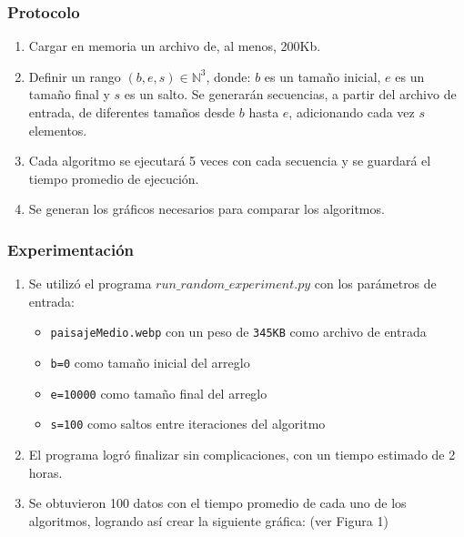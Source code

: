 \documentclass[letter]{article}
\begin{document}
\subsubsection{Protocolo}
\begin{enumerate}
    \item Cargar en memoria un archivo de, al menos, 200Kb.
    \item Definir un rango $(b,e,s)\in\mathbb{N}^3$, donde: $b$ es un tamaño inicial, $e$ es un tamaño final y $s$ es un salto. Se generarán secuencias, a partir del archivo de entrada, de diferentes tamaños desde $b$ hasta $e$, adicionando cada vez $s$ elementos.
    \item Cada algoritmo se ejecutará 5 veces con cada secuencia y se guardará el tiempo promedio de ejecución.
    \item Se generan los gráficos necesarios para comparar los algoritmos.
\end{enumerate}

\subsubsection{Experimentación}
\begin{enumerate}
    \item Se utilizó el programa \texttt{$run\_random\_experiment.py$} con los parámetros de entrada:
    \begin{itemize}
        \item \texttt{paisajeMedio.webp} con un peso de \texttt{345KB} como archivo de entrada
        \item \texttt{b=0} como tamaño inicial del arreglo
        \item \texttt{e=10000} como tamaño final del arreglo
        \item \texttt{s=100} como saltos entre iteraciones del algoritmo
    \end{itemize}
    \item El programa logró finalizar sin complicaciones, con un tiempo estimado de 2 horas.
    \item Se obtuvieron 100 datos con el tiempo promedio de cada uno de los algoritmos, logrando así crear la siguiente gráfica: (ver Figura 1)
\end{enumerate}
\end{document}
